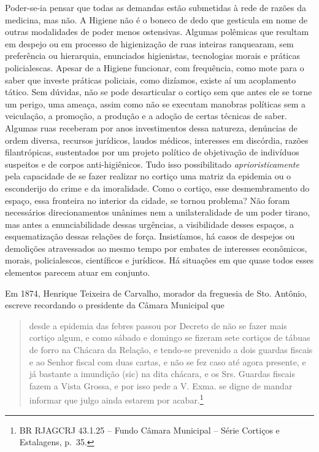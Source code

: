 Poder-se-ia pensar que todas as demandas estão submetidas à rede de
razões da medicina, mas não. A Higiene não é o boneco de dedo que
gesticula em nome de outras modalidades de poder menos ostensivas.
Algumas polêmicas que resultam em despejo ou em processo de higienização
de ruas inteiras ranquearam, sem preferência ou hierarquia, enunciados
higienistas, tecnologias morais e práticas policialescas. Apesar de a
Higiene funcionar, com frequência, como mote para o saber que investe
práticas policiais, como dizíamos, existe aí um acoplamento tático. Sem
dúvidas, não se pode desarticular o cortiço sem que antes ele se torne
um perigo, uma ameaça, assim como não se executam manobras políticas sem
a veiculação, a promoção, a produção e a adoção de certas técnicas de
saber. Algumas ruas receberam por anos investimentos dessa natureza,
denúncias de ordem diversa, recursos jurídicos, laudos médicos,
interesses em discórdia, razões filantrópicas, sustentados por um
projeto político de objetivação de indivíduos suspeitos e de corpos
anti-higiênicos. Tudo isso possibilitado \emph{aprioristicamente} pela
capacidade de se fazer realizar no cortiço uma matriz da epidemia ou o
esconderijo do crime e da imoralidade. Como o cortiço, esse
desmembramento do espaço, essa fronteira no interior da cidade, se
tornou problema? Não foram necessários direcionamentos unânimes nem a
unilateralidade de um poder tirano, mas antes a enunciabilidade dessas
urgências, a visibilidade desses espaços, a esquematização dessas
relações de força. Insistíamos, há casos de despejos ou demolições
atravessados ao mesmo tempo por embates de interesses econômicos,
morais, policialescos, científicos e jurídicos. Há situações em que
quase todos esses elementos parecem atuar em conjunto.

Em 1874, Henrique Teixeira de Carvalho, morador da freguesia de Sto.
Antônio, escreve recordando o presidente da Câmara Municipal que

\begin{quote}
desde a epidemia das febres passou por Decreto de não se fazer mais
cortiço algum, e como sábado e domingo se fizeram sete cortiços de
tábuas de forro na Chácara da Relação, e tendo-se prevenido a dois
guardas fiscais e ao Senhor fiscal com duas cartas, e não se fez caso
até agora presente, e já bastante a imundição (sic) na dita chácara, e
os Srs. Guardas fiscais fazem a Vista Grossa, e por isso pede a V. Exma.
se digne de mandar informar que julgo ainda estarem por
acabar.\footnote{BR RJAGCRJ 43.1.25 -- Fundo Câmara Municipal -- Série
  Cortiços e Estalagens, p.~35.}
\end{quote}

